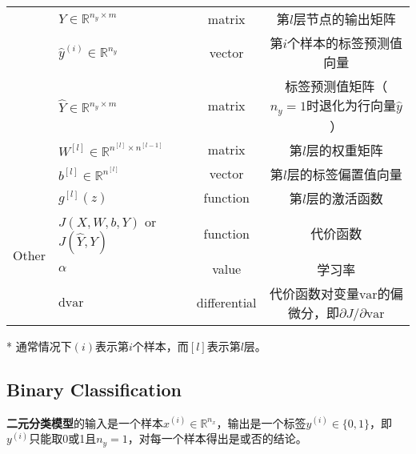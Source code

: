 \begin{table}[ht]
\begin{threeparttable}
\begin{tabular}{clcc}
									& $Y \in {\mathbb{R}^{n_y \times m}}$                   & matrix               & 第$l$层节点的输出矩阵                                                           \\									
									& $\hat{y}^{(i)} \in \mathbb{R}^{n_y}$                  & vector               & 第$i$个样本的标签预测值向量                                                \\
									& $\hat{Y} \in {\mathbb{R}^{n_y \times m}}$             & matrix               & 标签预测值矩阵（$n_y=1$时退化为行向量$\hat{y}$）   						\\
									& $W^{[l]} \in \mathbb{R}^{n^{[l]} \times n^{[l-1]}}$   & matrix               & 第$l$层的权重矩阵                                                               \\
									& $b^{[l]} \in \mathbb{R}^{n^{[l]}}$                    & vector               & 第$l$层的标签偏置值向量                                                        \\\hline
		\multirow{4}{*}{Other}      & $g^{[l]}(z)$                                          & function             & 第$l$层的激活函数                                                         \\
									& $J(X,W,b,Y)$ or $J(\hat{Y},Y)$                        & function             & 代价函数                                                                        \\
									& $\alpha$								                & value                & 学习率                                                                        \\
									& $\mathrm{d}\mathrm{var}$                              & differential         & 代价函数对变量$\mathrm{var}$的偏微分，即${\partial J}/{\partial \mathrm{var}}$ \\ \hline
	\end{tabular}
	\label{tab:notations} %
	\begin{tablenotes}
		\item[*] 通常情况下$(i)$表示第$i$个样本，而$[l]$表示第$l$层。
	\end{tablenotes}
	\end{threeparttable}
\end{table}

\subsection{Binary Classification}
\textbf{二元分类模型}的输入是一个样本$x^{(i)} \in \mathbb{R}^{n_x}$，输出是一个标签$y^{(i)} \in \{0, 1\}$，即$y^{(i)}$只能取0或1且$n_y=1$，对每一个样本得出是或否的结论。


